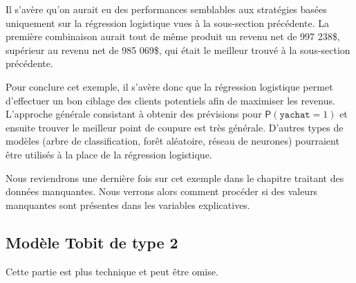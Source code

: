 \documentclass[
  11pt,
  letterpaper,
]{book}
\theoremstyle{definition}
\theoremstyle{definition}
\theoremstyle{definition}
\theoremstyle{definition}
\theoremstyle{remark}
\begin{document}
Il s'avère qu'on aurait eu des performances semblables aux stratégies basées uniquement sur la régression logistique vues à la sous-section précédente. La première combinaison aurait tout de même produit un revenu net de 997 238\$, supérieur au revenu net de 985 069\$, qui était le meilleur trouvé à la sous-section précédente.

Pour conclure cet exemple, il s'avère donc que la régression logistique permet d'effectuer un bon ciblage des clients potentiels afin de maximiser les revenus. L'approche générale consistant à obtenir des prévisions pour \({\mathsf P}\left(\texttt{yachat}=1\right)\) et ensuite trouver le meilleur point de coupure est très générale. D'autres types de modèles (arbre de classification, forêt aléatoire, réseau de neurones) pourraient être utilisés à la place de la régression logistique.

Nous reviendrons une dernière fois sur cet exemple dans le chapitre traitant des données manquantes. Nous verrons alors comment procéder si des valeurs manquantes sont présentes dans les variables explicatives.

\hypertarget{tobit2}{%
\subsection{Modèle Tobit de type 2}\label{tobit2}}

Cette partie est plus technique et peut être omise.
\end{document}
